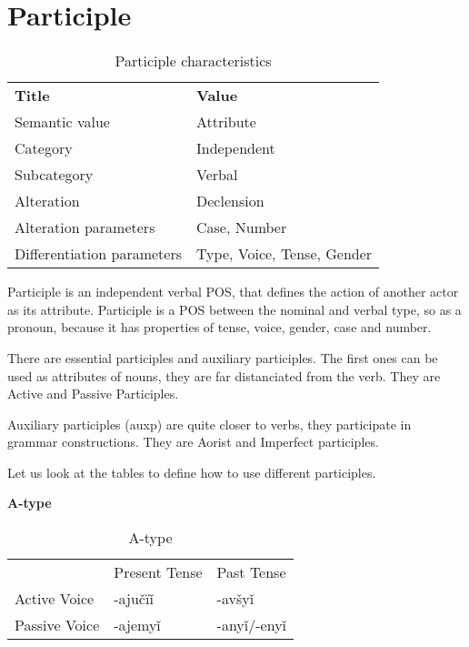 \section{Participle}


\begin{table}[h]
	\caption{Participle characteristics}
	\begin{tabular}{ll}
		\textbf{Title}              & \textbf{Value}               \\
		Semantic value              & Attribute                    \\
		Category                    & Independent                  \\
		Subcategory                 & Verbal                       \\
		Alteration                  & Declension                   \\
		Alteration parameters       & Case, Number                 \\
		Differentiation parameters  & Type, Voice, Tense, Gender
	\end{tabular}
\end{table}

Participle is an independent verbal POS, that defines the action of another actor as its attribute. Participle is a POS between the nominal and verbal type, so as a pronoun, because it has properties of tense, voice, gender, case and number.

There are essential participles and auxiliary participles. The first ones can be used as attributes of nouns, they are far distanciated from the verb. They are Active and Passive Participles.

Auxiliary participles (\gls{auxp}) are quite closer to verbs, they participate in grammar constructions. They are Aorist and Imperfect participles.

Let us look at the tables to define how to use different participles.

\textbf{A-type}

\begin{table}[!htb]
	\caption{A-type}
	\begin{tabular}{lll}
		& Present Tense & Past Tense \\
		 Active Voice & -ajučïǐ & -avšyǐ \\
		 Passive Voice & -ajemyǐ & -anyǐ/-enyǐ
	\end{tabular}
\end{table}

